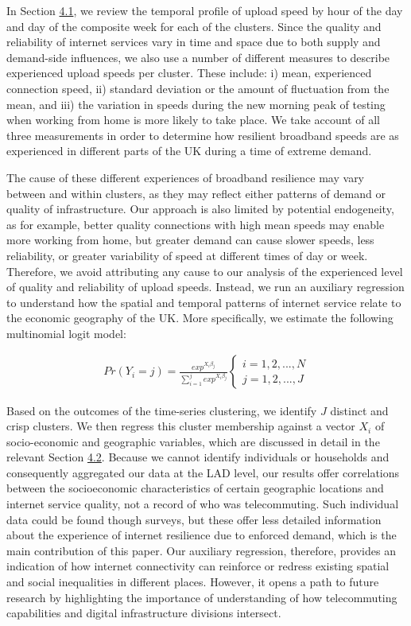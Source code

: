 \documentclass[]{interact}
\theoremstyle{plain}%
\theoremstyle{definition}
\theoremstyle{remark}
\begin{document}
In Section \protect\hyperlink{sec:4.1}{4.1}, we review the temporal
profile of upload speed by hour of the day and day of the composite week
for each of the clusters. Since the quality and reliability of internet
services vary in time and space due to both supply and demand-side
influences, we also use a number of different measures to describe
experienced upload speeds per cluster. These include: i) mean,
experienced connection speed, ii) standard deviation or the amount of
fluctuation from the mean, and iii) the variation in speeds during the
new morning peak of testing when working from home is more likely to
take place. We take account of all three measurements in order to
determine how resilient broadband speeds are as experienced in different
parts of the UK during a time of extreme demand.

The cause of these different experiences of broadband resilience may
vary between and within clusters, as they may reflect either patterns of
demand or quality of infrastructure. Our approach is also limited by
potential endogeneity, as for example, better quality connections with
high mean speeds may enable more working from home, but greater demand
can cause slower speeds, less reliability, or greater variability of
speed at different times of day or week. Therefore, we avoid attributing
any cause to our analysis of the experienced level of quality and
reliability of upload speeds. Instead, we run an auxiliary regression to
understand how the spatial and temporal patterns of internet service
relate to the economic geography of the UK. More specifically, we
estimate the following multinomial logit model:

\begin{align}
Pr(Y_{i}=j) = \frac{exp^{X_{i}\beta_{j}}}{\sum_{i=1}^j exp^{X_{i}\beta_{j}}}
\begin{cases}
    i = 1, 2, ... , N \\  
    j = 1, 2, ... , J
\end{cases}\label{eq1}
\end{align}

Based on the outcomes of the time-series clustering, we identify \(J\)
distinct and crisp clusters. We then regress this cluster membership
against a vector \(X_{i}\) of socio-economic and geographic variables,
which are discussed in detail in the relevant Section
\protect\hyperlink{sec:4.2}{4.2}. Because we cannot identify individuals
or households and consequently aggregated our data at the LAD level, our
results offer correlations between the socioeconomic characteristics of
certain geographic locations and internet service quality, not a record
of who was telecommuting. Such individual data could be found though
surveys, but these offer less detailed information about the experience
of internet resilience due to enforced demand, which is the main
contribution of this paper. Our auxiliary regression, therefore,
provides an indication of how internet connectivity can reinforce or
redress existing spatial and social inequalities in different places.
However, it opens a path to future research by highlighting the
importance of understanding of how telecommuting capabilities and
digital infrastructure divisions intersect.
\end{document}
